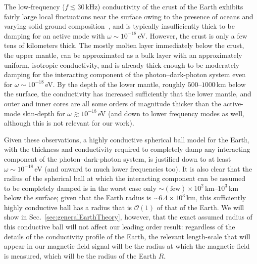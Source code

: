 \documentclass[amsmath,amssymb,aps,10pt,prd,letterpaper,nofootinbib,balancelastpage,notitlepage,superscriptaddress,twocolumn,floatfix]{revtex4-2}
\newcommand{\secref}[2][]{Sec{#1}.~\ref{#2}}		%
\begin{document}

The low-frequency ($f\lesssim 30\,$kHz) conductivity of the crust of the Earth exhibits fairly large local fluctuations near the surface owing to the presence of oceans and varying solid ground composition~\cite{atlas}, and is typically insufficiently thick to be damping for an active mode with $\omega \sim 10^{-18}$\,eV.
However, the crust is only a few tens of kilometers thick.
The mostly molten layer immediately below the crust, the upper mantle, can be approximated as a bulk layer with an approximately uniform, isotropic conductivity, and is already thick enough to be moderately damping for the interacting component of the photon--dark-photon system even for $\omega \sim 10^{-18}\,$eV.
By the depth of the lower mantle, roughly $500$--$1000$\,km below the surface, the conductivity has increased sufficiently that the lower mantle, and outer and inner cores are all some orders of magnitude thicker than the active-mode skin-depth for $\omega \gtrsim 10^{-18}\,$eV (and down to lower frequency modes as well, although this is not relevant for our work).

Given these observations, a highly conductive spherical ball model for the Earth, with the thickness and conductivity required to completely damp any interacting component of the photon--dark-photon system, is justified down to at least $\omega \sim 10^{-18}\,$eV (and onward to much lower frequencies too).
It is also clear that the radius of the spherical ball at which the interacting component can be assumed to be completely damped is in the worst case only $\sim (\text{few})\times 10^{2}\,$km--$10^3$\,km below the surface; given that the Earth radius is $\sim 6.4 \times 10^3\,$km, this sufficiently highly conductive ball has a radius that is $\mathcal{O}(1)$ of that of the Earth.
We will show in \secref{sec:generalEarthTheory}, however, that the exact assumed radius of this conductive ball will not affect our leading order result: regardless of the details of the conductivity profile of the Earth, the relevant length-scale that will appear in our magnetic field signal will be the radius at which the magnetic field is measured, which will be the radius of the Earth $R$.
\end{document}
